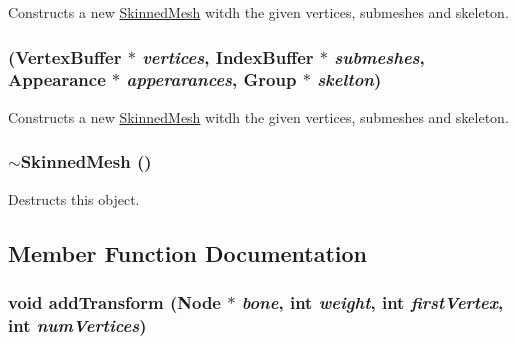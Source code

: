 Constructs a new \hyperlink{classm3g_1_1SkinnedMesh}{SkinnedMesh} witdh the given vertices, submeshes and skeleton. \hypertarget{classm3g_1_1SkinnedMesh_145692b6dfd3581aae05ef8f5db20a99}{
\subsubsection[{SkinnedMesh}]{ ({\bf VertexBuffer} $\ast$ {\em vertices}, \/  {\bf IndexBuffer} $\ast$ {\em submeshes}, \/  {\bf Appearance} $\ast$ {\em apperarances}, \/  Group $\ast$ {\em skelton})}}
\label{classm3g_1_1SkinnedMesh_145692b6dfd3581aae05ef8f5db20a99}


Constructs a new \hyperlink{classm3g_1_1SkinnedMesh}{SkinnedMesh} witdh the given vertices, submeshes and skeleton. \hypertarget{classm3g_1_1SkinnedMesh_c73da5b5c5f8f14fc241328b4b78928c}{
\subsubsection[{$\sim$SkinnedMesh}]{\setlength{\rightskip}{0pt plus 5cm}$\sim${\bf SkinnedMesh} ()}}
\label{classm3g_1_1SkinnedMesh_c73da5b5c5f8f14fc241328b4b78928c}


Destructs this object. 

\subsection{Member Function Documentation}
\hypertarget{classm3g_1_1SkinnedMesh_4b6fd5f52884251fdda11ad4a40d41d4}{
\subsubsection[{addTransform}]{\setlength{\rightskip}{0pt plus 5cm}void addTransform ({\bf Node} $\ast$ {\em bone}, \/  int {\em weight}, \/  int {\em firstVertex}, \/  int {\em numVertices})}}
\label{classm3g_1_1SkinnedMesh_4b6fd5f52884251fdda11ad4a40d41d4}


